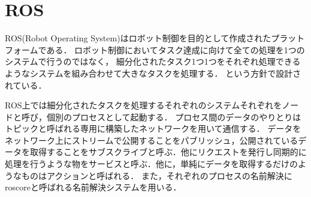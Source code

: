 \section{ROS}
ROS(Robot Operating System)はロボット制御を目的として作成されたプラットフォームである．
ロボット制御においてタスク達成に向けて全ての処理を1つのシステムで行うのではなく，
細分化されたタスク1つ1つをそれぞれ処理できるようなシステムを組み合わせて大きなタスクを処理する．
という方針で設計されている．

ROS上では細分化されたタスクを処理するそれぞれのシステムそれぞれをノードと呼び，個別のプロセスとして起動する．
プロセス間のデータのやりとりはトピックと呼ばれる専用に構築したネットワークを用いて通信する．
データをネットワーク上にストリームで公開することをパブリッシュ，公開されているデータを取得することをサブスクライブと呼ぶ．他にリクエストを発行し同期的に処理を行うような物をサービスと呼ぶ．他に，単純にデータを取得するだけのようなものはアクションと呼ばれる．
また，それぞれのプロセスの名前解決にroscoreと呼ばれる名前解決システムを用いる．
